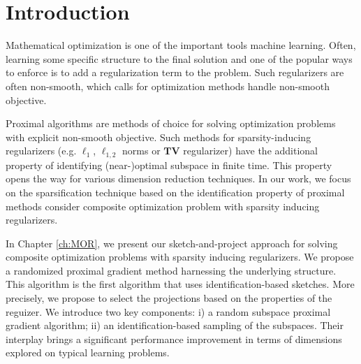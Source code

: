 \chapter*{Introduction}\label{ch:intro}
Mathematical optimization is one of the  important tools  machine learning.
Often, learning  some specific structure to the final solution and one of the popular ways to enforce  is to add a regularization term to the problem.%
Such regularizers are often non-smooth, which calls for optimization methods  handle  non-smooth objective.

Proximal algorithms are methods of choice for solving optimization problems with explicit non-smooth objective. Such methods for sparsity-inducing regularizers (e.g. $\ell_1$, $\ell_{1,2}$ norms or $\mathbf{TV}$ regularizer) have the additional property of identifying (near-)optimal subspace in finite time. This property opens the way for various dimension reduction techniques.
In our work, we focus on the sparsification technique based on the identification property of proximal methods  consider composite optimization problem with sparsity inducing regularizers.

In Chapter \ref{ch:MOR}, we present our sketch-and-project approach for solving composite optimization problems with sparsity inducing regularizers. We propose a randomized proximal gradient method harnessing the underlying structure. This algorithm is the first algorithm that uses identification-based sketches. More precisely, we propose to select the projections based on the properties of the reguizer. We introduce two key components: i) a random subspace proximal gradient algorithm; ii) an identification-based sampling of the subspaces. Their interplay brings a significant performance improvement in terms of dimensions explored on typical learning problems.

